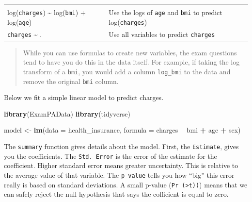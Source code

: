\documentclass[
  openany]{book}
\newenvironment{Shaded}{\begin{snugshade}}{\end{snugshade}}
\newcommand{\DataTypeTok}[1]{\textcolor[rgb]{0.13,0.29,0.53}{#1}}
\newcommand{\KeywordTok}[1]{\textcolor[rgb]{0.13,0.29,0.53}{\textbf{#1}}}
\newcommand{\NormalTok}[1]{#1}
\newcommand{\OperatorTok}[1]{\textcolor[rgb]{0.81,0.36,0.00}{\textbf{#1}}}
\newcommand{\StringTok}[1]{\textcolor[rgb]{0.31,0.60,0.02}{#1}}
\begin{document}
\begin{longtable}[]{@{}ll@{}}
\begin{minipage}[t]{0.53\columnwidth}
\end{minipage}\tabularnewline
\begin{minipage}[t]{0.41\columnwidth}\raggedright
log(\texttt{charges}) \textasciitilde{} log(\texttt{bmi}) + log(\texttt{age})\strut
\end{minipage} & \begin{minipage}[t]{0.53\columnwidth}\raggedright
Use the logs of \texttt{age} and \texttt{bmi} to predict log(\texttt{charges})\strut
\end{minipage}\tabularnewline
\begin{minipage}[t]{0.41\columnwidth}\raggedright
\texttt{charges} \textasciitilde{} .\strut
\end{minipage} & \begin{minipage}[t]{0.53\columnwidth}\raggedright
Use all variables to predict \texttt{charges}\strut
\end{minipage}\tabularnewline
\bottomrule
\end{longtable}

\begin{quote}
While you can use formulas to create new variables, the exam questions tend to have you do this in the data itself. For example, if taking the log transform of a \texttt{bmi}, you would add a column \texttt{log\_bmi} to the data and remove the original \texttt{bmi} column.
\end{quote}

Below we fit a simple linear model to predict charges.

\begin{Shaded}
\begin{Highlighting}[]
\KeywordTok{library}\NormalTok{(ExamPAData)}
\KeywordTok{library}\NormalTok{(tidyverse)}

\NormalTok{model <-}\StringTok{ }\KeywordTok{lm}\NormalTok{(}\DataTypeTok{data =}\NormalTok{ health_insurance, }\DataTypeTok{formula =}\NormalTok{ charges }\OperatorTok{~}\StringTok{ }\NormalTok{bmi }\OperatorTok{+}\StringTok{ }\NormalTok{age }\OperatorTok{+}\StringTok{ }\NormalTok{sex)}
\end{Highlighting}
\end{Shaded}

The \texttt{summary} function gives details about the model. First, the \texttt{Estimate}, gives you the coefficients. The \texttt{Std.\ Error} is the error of the estimate for the coefficient. Higher standard error means greater uncertainty. This is relative to the average value of that variable. The \texttt{p\ value} tells you how ``big'' this error really is based on standard deviations. A small p-value (\texttt{Pr\ (\textgreater{}\textbar{}t\textbar{}))}) means that we can safely reject the null hypothesis that says the cofficient is equal to zero.
\end{document}
